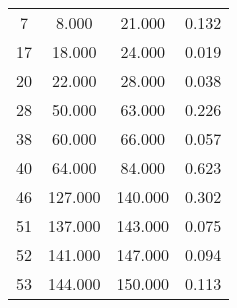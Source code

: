 % 
\begin{tabular}{cccc}
  \hline
  \hline
7 & 8.000 & 21.000 & 0.132 \\ 
  17 & 18.000 & 24.000 & 0.019 \\ 
  20 & 22.000 & 28.000 & 0.038 \\ 
  28 & 50.000 & 63.000 & 0.226 \\ 
  38 & 60.000 & 66.000 & 0.057 \\ 
  40 & 64.000 & 84.000 & 0.623 \\ 
  46 & 127.000 & 140.000 & 0.302 \\ 
  51 & 137.000 & 143.000 & 0.075 \\ 
  52 & 141.000 & 147.000 & 0.094 \\ 
  53 & 144.000 & 150.000 & 0.113 \\ 
   \hline
\end{tabular}
